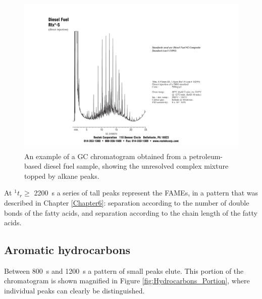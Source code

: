 \begin{figure}
	\centering
	\includegraphics[width=\textwidth]{Figures/hchump.pdf}
	\decoRule	
	
\caption[An example of a petrochemical fuel chromatogram.]{An example of a GC
chromatogram obtained from a petroleum-based diesel fuel sample, showing the
unresolved complex mixture topped by alkane peaks.}
	
	\label{fig:HCHump} 
\end{figure}

At \(^{1}t_{r} \geq \) \SI{2200}{\second} a series of tall peaks represent the
FAMEs, in a pattern that was described in Chapter \ref{Chapter6}: \oneD
separation according to the number of double bonds of the fatty acids, and \twoD
separation according to the chain length of the fatty acids.


\subsection{Aromatic hydrocarbons}

Between \SI{800}{\second} and \SI{1200}{\second} a pattern of small peaks elute.
This portion of the chromatogram is shown magnified in Figure
\ref{fig:Hydrocarbons_Portion}, where individual peaks can clearly be distinguished.

